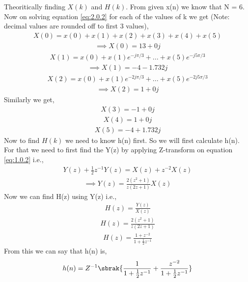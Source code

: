 \documentclass[journal,12pt,twocolumn]{IEEEtran}
\begin{document}
Theoritically finding $X(k)$ and $H(k)$. From given x(n) we know that N = 6. Now on solving equation \eqref{eq:2.0.2} for each of the values of k we get (Note: decimal values are rounded off to first 3 values),
\begin{align}
    X(0) = x(0) + x(1) + x(2) + x(3) + x(4) + x(5)
\end{align}
\begin{align}
    \implies X(0) = 13 + 0j
\end{align}
\begin{align}
    X(1) = x(0) + x(1)e^{-j\pi /3} + ... + x(5)e^{-j5\pi /3}
\end{align}
\begin{align}
    \implies X(1) = -4 - 1.732j
\end{align}
\begin{align}
    X(2) = x(0) + x(1)e^{-2j\pi /3} + ... + x(5)e^{-2j5\pi /3}
\end{align}
\begin{align}
    \implies X(2) = 1 + 0j
\end{align}
Similarly we get,
\begin{align}
    X(3) = -1 + 0j
\end{align}
\begin{align}
    X(4) = 1 + 0j
\end{align}
\begin{align}
    X(5) = -4 + 1.732j
\end{align}
Now to find $H(k)$ we need to know h(n) first. So we will first calculate h(n). For that we need to first find the Y(z) by applying Z-transform on equation \eqref{eq:1.0.2} i.e.,
\begin{align}
    Y(z) + \frac{1}{2}z^{-1}Y(z)=X(z) + z^{-2}X(z)
\end{align}
\begin{align}
    \implies Y(z)=\frac{2(z^2+1)}{z(2z+1)}X(z)
\end{align}
Now we can find H(z) using Y(z) i.e.,
\begin{align}
    H(z) = \frac{Y(z)}{X(z)}
\end{align}
\begin{align}
    H(z) = \frac{2(z^2+1)}{z(2z+1)}
\end{align}
\begin{align}
    H(z) = \frac{1+z^{-2}}{1+\frac{1}{2}z^{-1}}
\end{align}
From this we can say that h(n) is,
\begin{align}
    h(n)= Z^{-1}\sbrak{\frac{1}{1+\frac{1}{2}z^{-1}} + \frac{z^{-2}}{1+\frac{1}{2}z^{-1}}}
\end{align}
\end{document}
